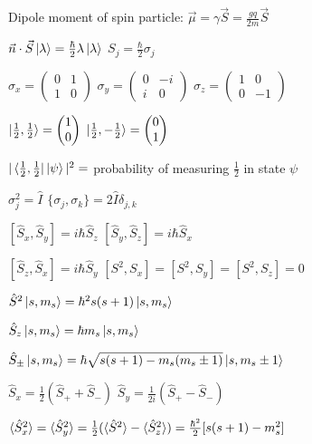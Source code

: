 \documentclass[10pt,landscape]{article}
\begin{document}
\begin{multicols}{3}
Dipole moment of spin particle:
$\vec{\mu} = \gamma\vec{S} = \frac{gq}{2m}\vec{S}$

$\vec{n} \cdot \vec{S} \ket{\lambda} = \frac{\hbar}{2}\lambda\ket{\lambda}$
\hspace*{1cm}
$S_j = \frac{\hbar}{2} \sigma_j$

$\sigma_x = 
\begin{pmatrix}
0 & 1 \\
1 & 0
\end{pmatrix}$
$\sigma_y = 
\begin{pmatrix}
0 & -i \\
i & 0
\end{pmatrix}$
$\sigma_z = 
\begin{pmatrix}
1 & 0 \\
0 & -1
\end{pmatrix}$

$\ket{\frac{1}{2}, \frac{1}{2}} = 
\begin{pmatrix}
1 \\
0
\end{pmatrix}$
\hspace*{1cm}
$\ket{\frac{1}{2}, -\frac{1}{2}} = 
\begin{pmatrix}
0 \\
1
\end{pmatrix}$

$|\bra{\frac{1}{2}, \frac{1}{2}}\ket{\psi}|^2=$ probability of measuring $\frac{1}{2}$ in state $\psi$ 

$\sigma_j^2 = \hat{I}$
\hspace*{1cm}
$\{\sigma_j,\sigma_k\} = 2\hat{I}\delta_{j,k}$

$[\hat{S}_x, \hat{S}_y] = i\hbar\hat{S}_z$
\hspace*{1cm}
$[\hat{S}_y, \hat{S}_z] = i\hbar\hat{S}_x$

$[\hat{S}_z, \hat{S}_x] = i\hbar\hat{S}_y$
\hspace*{1cm}
$[S^2, S_x] = [S^2, S_y] = [S^2, S_z] = 0$

$\hat{S}^2\ket{s, m_s} = \hbar^2 s(s+1)\ket{s, m_s}$

$\hat{S}_z\ket{s, m_s} = \hbar m_s\ket{s, m_s}$

$\hat{S}_{\pm} \ket{s, m_s} = \hbar \sqrt{s(s+1)- m_s(m_s \pm 1)}\ket{s, m_s \pm 1}$

$\hat{S}_x = \frac{1}{2} (\hat{S}_+ + \hat{S}_-)$
\hspace*{1cm}
$\hat{S}_y = \frac{1}{2i} (\hat{S}_+ - \hat{S}_-)$

$\braket{\hat{S}_x^2} = \braket{\hat{S}_y^2} = \frac{1}{2}(\braket{\hat{S}^2} - \braket{\hat{S}_z^2}) = \frac{\hbar^2}{2}[s(s+1)-m_s^2]$


\end{multicols}
\end{document}
